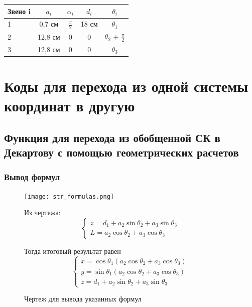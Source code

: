 \documentclass{article}
\begin{document}
\begin{tabular}{|l||c|c|c|c|}
\hline
Звено i & $a_i$ & $\alpha_i$ & $d_i$ & $\theta_i$\\
\hline
\hline
1 & 0,7 см & $\frac{\pi}2$ & 18 см & $\theta_1$  \\ \hline
2 & 12,8 см & 0 & 0 & $\theta_2$ + $\frac{\pi}2$ \\ \hline
3 & 12,8 см & 0 & 0 & $\theta_3$\\
\hline
\end{tabular}

\section{Коды для перехода из одной системы координат в другую}
\subsection{Функция для перехода из обобщенной СК в Декартову с помощью геометрических расчетов}
\subsubsection*{Вывод формул}
\begin{figure}[h!]
\begin{minipage}{.65\textwidth}
\centering
\texttt{[image: str\_formulas.png]}
\caption{Чертеж для вывода указанных формул}
\end{minipage}
\begin{minipage}{.35\textwidth}
\centering
Из чертежа: 
\begin{equation*}
    \begin{cases}
        z = d_1 + a_2\sin{\theta_2} + a_3\sin{\theta_3} \\
        L = a_2\cos{\theta_2} + a_3\cos{\theta_3}
    \end{cases}
\end{equation*}

Тогда итоговый результат равен\\
\begin{equation*}
    \begin{cases}
        x = \cos{\theta_1}(a_2\cos{\theta_2} + a_3\cos{\theta_3}) \\
        y = \sin{\theta_1}(a_2\cos{\theta_2} + a_3\cos{\theta_3}) \\
        z = d_1 + a_2\sin{\theta_2} + a_3\sin{\theta_3}
    \end{cases}
\end{equation*}

\end{minipage}
\end{figure}
\FloatBarrier
\end{document}
